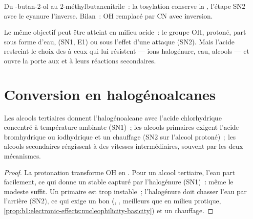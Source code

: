 \begin{omfigure}

{\small Du -butan-2-ol au 2-méthylbutanenitrile~: la tosylation
conserve la , l'étape SN2 avec le cyanure l'inverse.
Bilan~: OH remplacé par CN avec inversion.}
\end{omfigure}

Le même objectif peut être atteint en milieu acide~: le groupe OH,
protoné, part sous forme d'eau,  (SN1, E1) ou
sous l'effet d'une attaque (SN2). Mais l'acide restreint le choix des
 à ceux qui lui résistent --- ions halogénure, eau, alcools
--- et ouvre la porte aux  et à leurs réactions secondaires.

\section{Conversion en halogénoalcanes}

\begin{proposition}\label{prop:b1:alcohol-activation:hx-by-class}
Les alcools tertiaires donnent l'halogénoalcane avec l'acide
chlorhydrique concentré à température ambiante (SN1)~; les alcools
primaires exigent l'acide bromhydrique ou iodhydrique et un chauffage
(SN2 sur l'alcool protoné)~; les alcools secondaires réagissent à des
vitesses intermédiaires, souvent par les deux mécanismes.
\end{proposition}

\begin{proof}
La protonation transforme OH en . Pour un alcool tertiaire,
l'eau part facilement, ce qui donne un  stable capturé par
l'halogénure (SN1)~: même le modeste   suffit. Un
 primaire est trop instable~; l'halogénure doit chasser l'eau
par l'arrière (SN2), ce qui exige un bon  (, ,
meilleurs que  en milieu protique,
\cref{prop:b1:electronic-effects:nucleophilicity-basicity}) et un
chauffage.
\end{proof}

